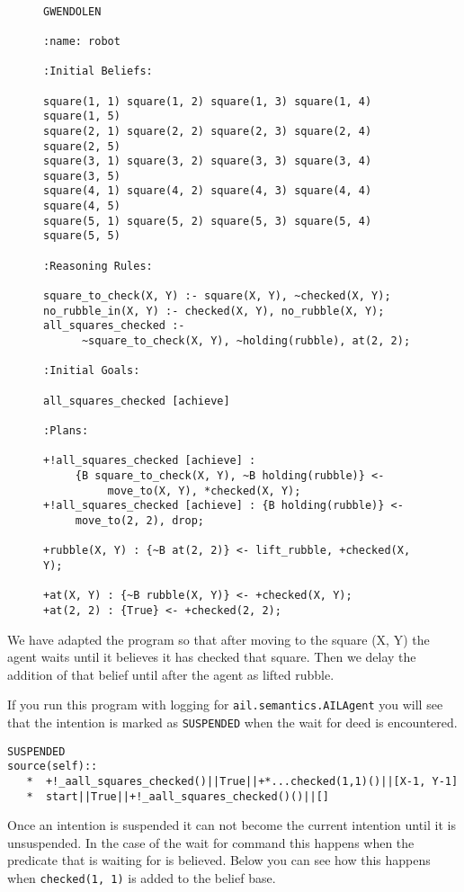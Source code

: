 \begin{figure}[!htb]
\begin{ourexample}
\label{code:pickuprubble_waitfor} \quad \\
\begin{lstlisting}[basicstyle=\sffamily,style=easslisting,language=Gwendolen]
GWENDOLEN

:name: robot

:Initial Beliefs:

square(1, 1) square(1, 2) square(1, 3) square(1, 4) square(1, 5)
square(2, 1) square(2, 2) square(2, 3) square(2, 4) square(2, 5)
square(3, 1) square(3, 2) square(3, 3) square(3, 4) square(3, 5)
square(4, 1) square(4, 2) square(4, 3) square(4, 4) square(4, 5)
square(5, 1) square(5, 2) square(5, 3) square(5, 4) square(5, 5)

:Reasoning Rules:

square_to_check(X, Y) :- square(X, Y), ~checked(X, Y);
no_rubble_in(X, Y) :- checked(X, Y), no_rubble(X, Y);
all_squares_checked :-
      ~square_to_check(X, Y), ~holding(rubble), at(2, 2);

:Initial Goals:

all_squares_checked [achieve]

:Plans:

+!all_squares_checked [achieve] : 
     {B square_to_check(X, Y), ~B holding(rubble)} <- 
          move_to(X, Y), *checked(X, Y);
+!all_squares_checked [achieve] : {B holding(rubble)} <- 
     move_to(2, 2), drop;

+rubble(X, Y) : {~B at(2, 2)} <- lift_rubble, +checked(X, Y);

+at(X, Y) : {~B rubble(X, Y)} <- +checked(X, Y);
+at(2, 2) : {True} <- +checked(2, 2);
\end{lstlisting}
\end{ourexample}
\end{figure}
We have adapted the program so that after moving to the square (X, Y) the agent waits until it believes it has checked that square.  Then we delay the addition of that belief until after the agent as lifted rubble.

If you run this program with logging for \texttt{ail.semantics.AILAgent} you will see that the intention is marked as \texttt{SUSPENDED} when the wait for deed is encountered.
\begin{verbatim}
SUSPENDED
source(self):: 
   *  +!_aall_squares_checked()||True||+*...checked(1,1)()||[X-1, Y-1]
   *  start||True||+!_aall_squares_checked()()||[]
\end{verbatim}
Once an intention is suspended it can not become the current intention until it is unsuspended.  In the case of the wait for command this happens when the predicate that is waiting for is believed.  Below you can see how this happens when \texttt{checked(1, 1)} is added to the belief base.

